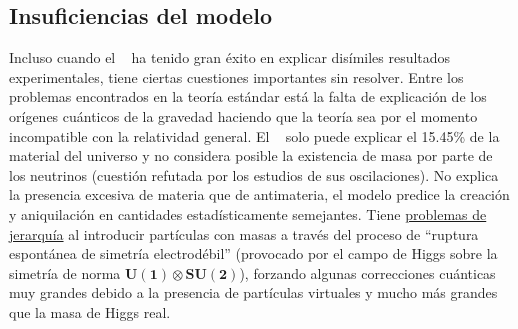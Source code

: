 

\subsection{Insuficiencias del modelo}

Incluso cuando el \ME ~ ha tenido gran éxito en explicar disímiles resultados experimentales,  tiene ciertas cuestiones importantes sin resolver. Entre los problemas encontrados en la teoría estándar está la falta de explicación de los orígenes cuánticos de la gravedad haciendo que la teoría sea por el momento incompatible con la relatividad general. El \ME ~ solo puede explicar el 15.45\% de la material del universo y no considera posible la existencia de masa por parte de los neutrinos (cuestión refutada por los estudios de sus oscilaciones). No explica la presencia excesiva de materia que de antimateria, el modelo predice la creación y aniquilación en cantidades estadísticamente semejantes. Tiene \href{https://en.wikipedia.org/wiki/Hierarchy_problem}{problemas de jerarquía} al introducir partículas con masas a través del proceso de ``ruptura espontánea de simetría electrodébil'' (provocado por el campo de Higgs sobre la simetría de norma $\mathbf{U(1) \otimes SU(2)}$), forzando algunas correcciones cuánticas muy grandes debido a la presencia de partículas virtuales y mucho más grandes que la masa de Higgs real.


